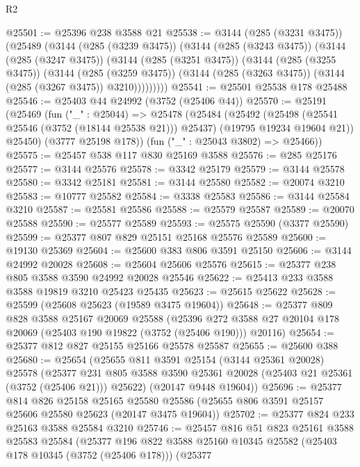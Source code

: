 \begin{lexlean}{R2}
\begin{coremodule}
@25501 := @25396 @238 @3588 @21
@25538 := @3144
    (@285 (@3231 @3475))
    (@25489
      (@3144
        (@285 (@3239 @3475))
        (@3144
          (@285 (@3243 @3475))
          (@3144
            (@285 (@3247 @3475))
            (@3144
              (@285 (@3251 @3475))
              (@3144
                (@285 (@3255 @3475))
                (@3144
                  (@285 (@3259 @3475))
                  (@3144 (@285 (@3263 @3475)) (@3144 (@285 (@3267 @3475)) @3210)))))))))
@25541 := @25501 @25538 @178 @25488
@25546 := @25403 @44 @24992 (@3752 (@25406 @44))
@25570 := @25191
    (@25469
      (fun ("_" : @25044) =>
      @25478
        (@25484
          (@25492
            (@25498 (@25541 @25546 (@3752 (@18144 @25538 @21))) @25437)
            (@19795 @19234 @19604 @21))
          @25450)
        (@3777 @25198 @178))
      (fun ("_" : @25043 @3802) => @25466))
@25575 := @25457 @538 @117 @830 @25169 @3588
@25576 := @285 @25176
@25577 := @3144 @25576
@25578 := @3342 @25179
@25579 := @3144 @25578
@25580 := @3342 @25181
@25581 := @3144 @25580
@25582 := @20074 @3210
@25583 := @10777 @25582
@25584 := @3338 @25583
@25586 := @3144 @25584 @3210
@25587 := @25581 @25586
@25588 := @25579 @25587
@25589 := @20070 @25588
@25590 := @25577 @25589
@25593 := @25575 @25590 (@3377 @25590)
@25599 := @25377 @807 @829 @25151 @25168 @25576 @25589
@25600 := @19130 @25369
@25604 := @25600 @383 @806 @3591 @25150
@25606 := @3144 @24992 @20028
@25608 := @25604 @25606 @25576
@25615 := @25377 @238 @805 @3588 @3590 @24992 @20028 @25546
@25622 := @25413 @233 @3588 @3588 @19819 @3210 @25423 @25435
@25623 := @25615 @25622
@25628 := @25599 (@25608 @25623 (@19589 @3475 @19604))
@25648 := @25377
    @809
    @828
    @3588
    @25167
    @20069
    @25588
    (@25396 @272 @3588 @27 @20104 @178 @20069 (@25403 @190 @19822 (@3752 (@25406 @190))) @20116)
@25654 := @25377 @812 @827 @25155 @25166 @25578 @25587
@25655 := @25600 @388
@25680 := @25654
    (@25655
      @811
      @3591
      @25154
      (@3144 @25361 @20028)
      @25578
      (@25377 @231 @805 @3588 @3590 @25361 @20028 (@25403 @21 @25361 (@3752 (@25406 @21))) @25622)
      (@20147 @9448 @19604))
@25696 := @25377
    @814
    @826
    @25158
    @25165
    @25580
    @25586
    (@25655 @806 @3591 @25157 @25606 @25580 @25623 (@20147 @3475 @19604))
@25702 := @25377 @824 @233 @25163 @3588 @25584 @3210
@25746 := @25457
    @816
    @51
    @823
    @25161
    @3588
    @25583
    @25584
    (@25377
      @196
      @822
      @3588
      @25160
      @10345
      @25582
      (@25403 @178 @10345 (@3752 (@25406 @178)))
      (@25377

\end{coremodule}
\end{lexlean}
